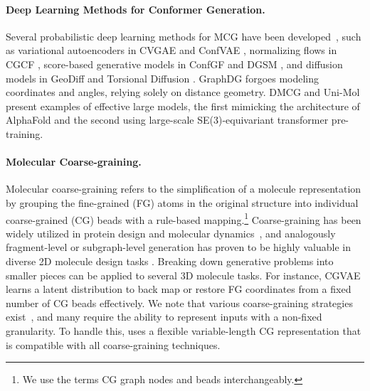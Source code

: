 \paragraph{Deep Learning Methods for Conformer Generation.} Several probabilistic deep learning methods for MCG have been developed~\citep{generative_background}, such as variational autoencoders in CVGAE \citep{CVGAE} and ConfVAE \citep{ConfVAE}, normalizing flows in CGCF \citep{CGCF}, score-based generative models in ConfGF \citep{ConfGF} and DGSM \citep{DGSM}, and diffusion models in GeoDiff \citep{geodiff} and Torsional Diffusion \citep{torsional-diffusion}. GraphDG \citep{GraphDG} forgoes modeling coordinates and angles, relying solely on distance geometry. DMCG \citep{DMCG} and Uni-Mol \citep{unimol} present examples of effective large models, the first mimicking the architecture of AlphaFold \citep{alphafold} and the second using large-scale SE(3)-equivariant transformer pre-training. 


\paragraph{Molecular Coarse-graining.} Molecular coarse-graining refers to the simplification of a molecule representation by grouping the fine-grained (FG) atoms in the original structure into individual coarse-grained (CG) beads with a rule-based mapping.\footnote{We use the terms CG graph nodes and beads interchangeably.} %
Coarse-graining has been widely utilized in protein design \citep{CGProt-background} and molecular dynamics~\citep{cg-force-field}, and analogously fragment-level or subgraph-level generation has proven to be highly valuable in diverse 2D molecule design tasks \citep{FaST}.
Breaking down generative problems into smaller pieces can be applied to several 3D molecule tasks. For instance, CGVAE \citep{CGVAE} learns a latent distribution to back map or restore FG coordinates from a fixed number of CG beads effectively.
We note that various coarse-graining strategies exist~\citep{cg-survey, arts2023diffusion, CG-MD, cg_thermo}, and many require the ability to represent inputs with a non-fixed granularity. 
To handle this, \model uses a flexible variable-length CG representation that is compatible with all coarse-graining techniques.

